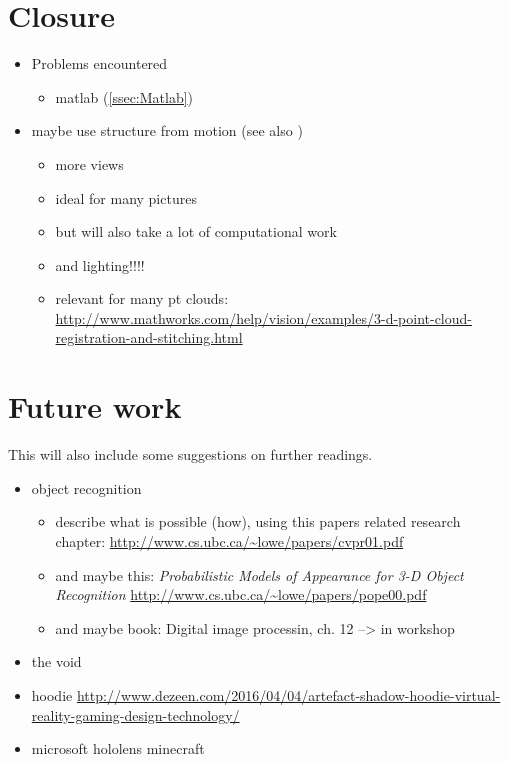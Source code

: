 \section{Closure}
\begin{itemize}
\item Problems encountered
	\begin{itemize}
	\item matlab (\autoref{ssec:Matlab})
	\end{itemize}
\item maybe use structure from motion (see also \cite{Gordon.2004})
	\begin{itemize}
	\item more views
	\item ideal for many pictures
	\item but will also take a lot of computational work
	\item and lighting!!!!
	\item relevant for many pt clouds: \url{http://www.mathworks.com/help/vision/examples/3-d-point-cloud-registration-and-stitching.html}
	\end{itemize}
\end{itemize}


\section{Future work}\label{sec:Future}
This will also include some suggestions on further readings.

\begin{itemize}
\item object recognition
	\begin{itemize}
	\item describe what is possible (how), using this papers related research chapter: \cite{Lowe.2001} \url{http://www.cs.ubc.ca/~lowe/papers/cvpr01.pdf}
	\item and maybe this: \textit{Probabilistic Models of Appearance for 3-D Object Recognition}  \url{http://www.cs.ubc.ca/~lowe/papers/pope00.pdf}
	\item and maybe book: Digital image processin, ch. 12 --> in workshop
	\end{itemize}
\item the void
\item hoodie \url{http://www.dezeen.com/2016/04/04/artefact-shadow-hoodie-virtual-reality-gaming-design-technology/}
\item microsoft hololens minecraft
	
\end{itemize}
